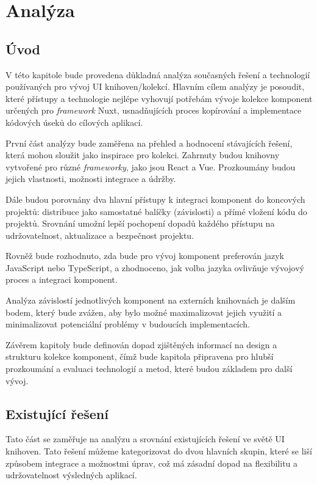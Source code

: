 
\chapter{Analýza}

\section{Úvod}
V této kapitole bude provedena důkladná analýza současných řešení a technologií používaných pro vývoj UI knihoven/kolekcí. Hlavním cílem analýzy je posoudit, které přístupy a technologie nejlépe vyhovují potřebám vývoje kolekce komponent určených pro \emph{framework} Nuxt, usnadňujících proces kopírování a implementace kódových úseků do cílových aplikací.

První část analýzy bude zaměřena na přehled a hodnocení stávajících řešení, která mohou sloužit jako inspirace pro kolekci. Zahrnuty budou knihovny vytvořené pro různé \emph{frameworky}, jako jsou React a Vue. Prozkoumány budou jejich vlastnosti, možnosti integrace a údržby.

Dále budou porovnány dva hlavní přístupy k integraci komponent do koncových projektů: distribuce jako samostatné balíčky (závislosti) a přímé vložení kódu do projektů. Srovnání umožní lepší pochopení dopadů každého přístupu na udržovatelnost, aktualizace a bezpečnost projektu.

Rovněž bude rozhodnuto, zda bude pro vývoj komponent preferován jazyk JavaScript nebo TypeScript, a zhodnoceno, jak volba jazyka ovlivňuje vývojový proces a integraci komponent.

Analýza závislostí jednotlivých komponent na externích knihovnách je dalším bodem, který bude zvážen, aby bylo možné maximalizovat jejich využití a minimalizovat potenciální problémy v budoucích implementacích.

Závěrem kapitoly bude definován dopad zjištěných informací na design a strukturu kolekce komponent, čímž bude kapitola připravena pro hlubší prozkoumání a evaluaci technologií a metod, které budou základem pro další vývoj.

\section{Existující řešení}

Tato část se zaměřuje na analýzu a srovnání existujících řešení ve světě UI knihoven. Tato řešení můžeme kategorizovat do dvou hlavních skupin, které se liší způsobem integrace a možnostmi úprav, což má zásadní dopad na flexibilitu a udržovatelnost výsledných aplikací.

